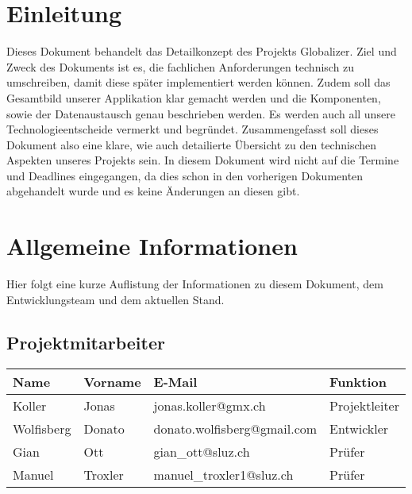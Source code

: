 


	

	\begin{center}
	\end{center}

	\section{Einleitung}
	Dieses Dokument behandelt das Detailkonzept des Projekts Globalizer. Ziel und Zweck des Dokuments ist es, die fachlichen Anforderungen technisch zu umschreiben, damit diese später implementiert werden können. Zudem soll das Gesamtbild unserer Applikation klar gemacht werden und die Komponenten, sowie der Datenaustausch genau beschrieben werden. Es werden auch all unsere Technologieentscheide vermerkt und begründet. Zusammengefasst soll dieses Dokument also eine klare, wie auch detailierte Übersicht zu den technischen Aspekten unseres Projekts sein. In diesem Dokument wird nicht auf die Termine und Deadlines eingegangen, da dies schon in den vorherigen Dokumenten abgehandelt wurde und es keine Änderungen an diesen gibt.

	\newpage

	\section{Allgemeine Informationen}
	Hier folgt eine kurze Auflistung der Informationen zu diesem Dokument, dem Ent\-wicklungsteam und dem aktuellen Stand.

	\subsection{Projektmitarbeiter}
	\begin{table}[h]
		\begin{tabularx}{\textwidth}{|l|l|X|l|}
			\hline
			\textbf{Name} & \textbf{Vorname}  & \textbf{E-Mail}                & \textbf{Funktion}     \\ \hline
			Koller        & Jonas             & jonas.koller@gmx.ch            & Projektleiter         \\ \hline
			Wolfisberg    & Donato            & donato.wolfisberg@gmail.com    & Entwickler            \\ \hline
			Gian          & Ott               & gian\_ott@sluz.ch              & Prüfer                \\ \hline
			Manuel        & Troxler           & manuel\_troxler1@sluz.ch        & Prüfer                \\ \hline
		\end{tabularx}
	\end{table}

